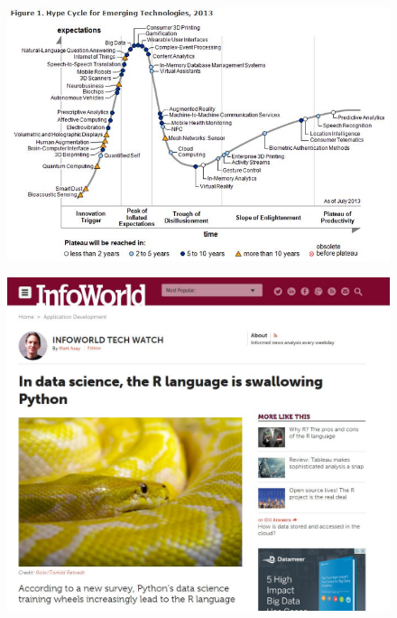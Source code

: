 \documentclass{beamer}
\begin{document}
\begin{frame}
\begin{figure}
\centering
\includegraphics[width=1.1\linewidth]{hypecycle}
\end{figure}
\end{frame}
\begin{frame}
	\begin{figure}
\centering
\includegraphics[width=0.9\linewidth]{mjasay2}
\end{figure}

\end{frame}
\end{document}
